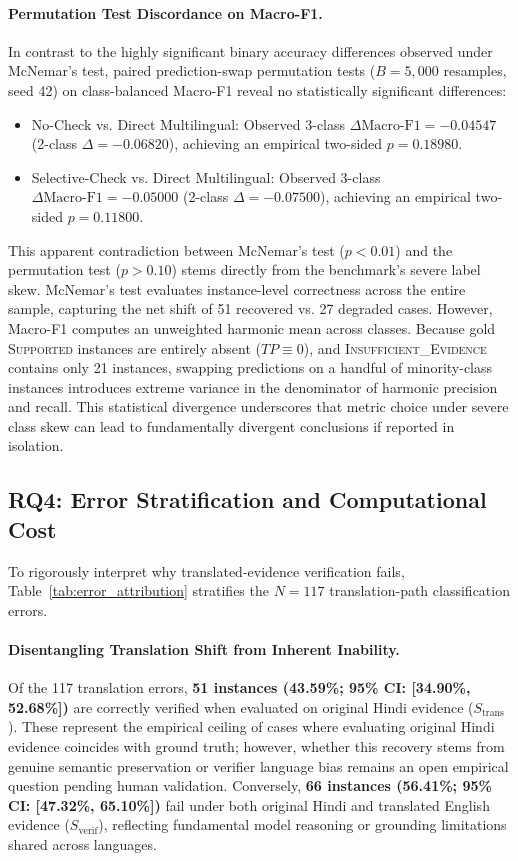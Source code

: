 \paragraph{Permutation Test Discordance on Macro-F1.}
In contrast to the highly significant binary accuracy differences observed under McNemar's test, paired prediction-swap permutation tests ($B=5,000$ resamples, seed 42) on class-balanced Macro-F1 reveal no statistically significant differences:
\begin{itemize}
    \item No-Check vs. Direct Multilingual: Observed 3-class $\Delta \text{Macro-F1} = -0.04547$ (2-class $\Delta = -0.06820$), achieving an empirical two-sided \textbf{$p = 0.18980$}.
    \item Selective-Check vs. Direct Multilingual: Observed 3-class $\Delta \text{Macro-F1} = -0.05000$ (2-class $\Delta = -0.07500$), achieving an empirical two-sided \textbf{$p = 0.11800$}.
\end{itemize}

This apparent contradiction between McNemar's test ($p < 0.01$) and the permutation test ($p > 0.10$) stems directly from the benchmark's severe label skew. McNemar's test evaluates instance-level correctness across the entire sample, capturing the net shift of 51 recovered vs. 27 degraded cases. However, Macro-F1 computes an unweighted harmonic mean across classes. Because gold \textsc{Supported} instances are entirely absent ($TP \equiv 0$), and \textsc{Insufficient\_Evidence} contains only 21 instances, swapping predictions on a handful of minority-class instances introduces extreme variance in the denominator of harmonic precision and recall. This statistical divergence underscores that metric choice under severe class skew can lead to fundamentally divergent conclusions if reported in isolation.

\subsection{RQ4: Error Stratification and Computational Cost}
To rigorously interpret why translated-evidence verification fails, Table~\ref{tab:error_attribution} stratifies the $N=117$ translation-path classification errors.



\paragraph{Disentangling Translation Shift from Inherent Inability.}
Of the 117 translation errors, \textbf{51 instances (43.59\%; 95\% CI: [34.90\%, 52.68\%])} are correctly verified when evaluated on original Hindi evidence ($S_{\text{trans}}$). These represent the empirical ceiling of cases where evaluating original Hindi evidence coincides with ground truth; however, whether this recovery stems from genuine semantic preservation or verifier language bias remains an open empirical question pending human validation. Conversely, \textbf{66 instances (56.41\%; 95\% CI: [47.32\%, 65.10\%])} fail under both original Hindi and translated English evidence ($S_{\text{verif}}$), reflecting fundamental model reasoning or grounding limitations shared across languages.

